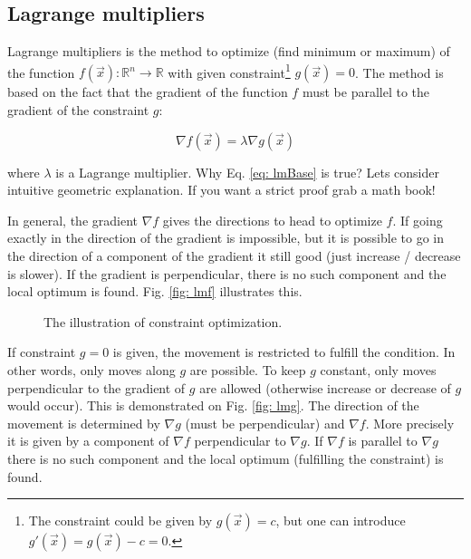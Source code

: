 \subsection{Lagrange multipliers}
\label{sec: lm}

Lagrange multipliers is the method to optimize (find minimum or maximum) of the function $f (\vec x) : \mathbb{R}^n \rightarrow \mathbb{R}$ with given constraint\footnote{The constraint could be given by $g (\vec x) = c$, but one can introduce $g'(\vec x) = g (\vec x) - c = 0$.} $g (\vec x) = 0$. The method is based on the fact that the gradient of the function $f$ must be parallel to the gradient of the constraint $g$:

\begin{equation}
 \nabla f (\vec x) = \lambda \nabla g (\vec x)
 \label{eq: lmBase}
\end{equation}

where $\lambda$ is a Lagrange multiplier. Why Eq. \ref{eq: lmBase} is true? Lets consider intuitive geometric explanation. If you want a strict proof grab a math book!

In general, the gradient $\nabla f$ gives the directions to head to optimize $f$. If going exactly in the direction of the gradient is impossible, but it is possible to go in the direction of a component of the gradient it still good (just increase / decrease is slower). If the gradient is perpendicular, there is no such component and the local optimum is found. Fig. \ref{fig: lmf} illustrates this.

\begin{figure}
\hfill
{}
\hfill
{}
\hfill
\caption{The illustration of constraint optimization.}
\end{figure}

If constraint $g = 0$ is given, the movement is restricted to fulfill the condition. In other words, only moves along $g$ are possible. To keep $g$ constant, only moves perpendicular to the gradient of $g$ are allowed (otherwise increase or decrease of $g$ would occur). This is demonstrated on Fig. \ref{fig: lmg}. The direction of the movement is determined by $\nabla g$ (must be perpendicular) and $\nabla f$. More precisely it is given by a component of $\nabla f$ perpendicular to $\nabla g$. If $\nabla f$ is parallel to $\nabla g$ there is no such component and the local optimum (fulfilling the constraint) is found.

